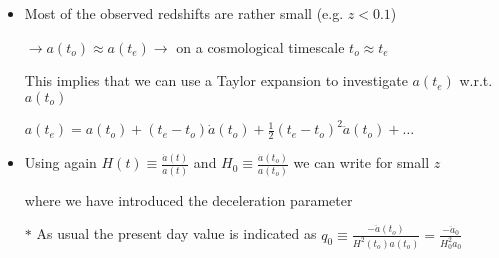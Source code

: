 \Tr
\begin{itemize}
\item Most of the observed redshifts are rather small (e.g. $z<0.1$)
\item[] $\rightarrow a(t_{o}) \approx a(t_{e}) \rightarrow$ on a cosmological timescale $t_{o} \approx t_{e}$
\item[] This implies that we can use a Taylor expansion to investigate $a(t_{e})$ w.r.t. $a(t_{o})$
\item[] $a(t_{e})=a(t_{o})+(t_{e}-t_{o})\dot{a}(t_{o})+\frac{1}{2}(t_{e}-t_{o})^{2}\ddot{a}(t_{o})+\ldots$
\item Using again {\blue $\displaystyle H(t) \equiv \frac{\dot{a}(t)}{a(t)}$} and
      {\blue $\displaystyle H_{0} \equiv \frac{\dot{a}(t_{o})}{a(t_{o})}$} we can write {\red for small $z$}
\item[] \begin{center}
        {\red {}}
        \end{center}
\item[] where we have introduced the {\blue deceleration parameter}
\item[] \begin{center}
        {\red {}}
        \end{center}
\item[$\ast$] As usual the present day value is indicated as
        $\displaystyle q_{0} \equiv \frac{-\ddot{a}(t_{o})}{H^{2}(t_{o})a(t_{o})}=
        \frac{-\ddot{a}_{0}}{H_{0}^{2}a_{0}}$
\end{itemize}

